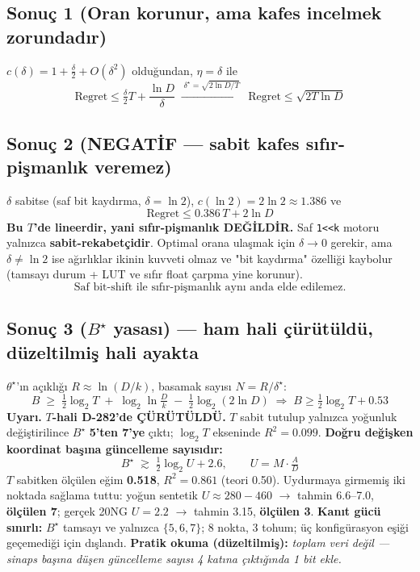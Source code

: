 \documentclass[11pt]{article}
\newenvironment{notkutu}{\def\FrameCommand{\fboxsep=6pt\colorbox{kutu}}\MakeFramed{\advance\hsize-\width\FrameRestore}\small}{\endMakeFramed}
\begin{document}
\subsection*{Sonuç 1 (Oran korunur, ama kafes incelmek zorundadır)}
$c(\delta) = 1 + \tfrac{\delta}{2} + O(\delta^2)$ olduğundan, $\eta=\delta$ ile
\[\mathrm{Regret} \le \tfrac{\delta}{2}T + \frac{\ln D}{\delta} \;\xrightarrow{\;\delta^\star=\sqrt{2\ln D/T}\;}\; \mathrm{Regret} \le \sqrt{2T\ln D}\]
\subsection*{Sonuç 2 (NEGATİF — sabit kafes sıfır-pişmanlık veremez)}
$\delta$ sabitse (saf bit kaydırma, $\delta=\ln2$), $c(\ln 2) = 2\ln 2 \approx 1.386$ ve
\[\mathrm{Regret} \le 0.386\,T + 2\ln D\]
\textbf{Bu $T$'de lineerdir, yani sıfır-pişmanlık DEĞİLDİR.} Saf \texttt{1<<k} motoru yalnızca \textbf{sabit-rekabetçidir}. Optimal orana ulaşmak için $\delta\to 0$ gerekir, ama $\delta\neq\ln2$ ise ağırlıklar ikinin kuvveti olmaz ve "bit kaydırma" özelliği kaybolur (tamsayı durum + LUT ve sıfır float çarpma yine korunur).
\[\boxed{\text{Saf bit-shift ile sıfır-pişmanlık aynı anda elde edilemez.}}\]
\subsection*{Sonuç 3 ($B^\star$ yasası) —  ham hali çürütüldü, düzeltilmiş hali ayakta}
$\theta^\star$'ın açıklığı $R\approx\ln(D/k)$, basamak sayısı $N=R/\delta^\star$:
\[B \;\ge\; \tfrac12\log_2 T \;+\; \log_2\ln\tfrac{D}{k} \;-\; \tfrac12\log_2(2\ln D)\;\Longrightarrow\; B \ge \tfrac12\log_2 T + 0.53\]
\begin{notkutu}\textbf{Uyarı.} \textbf{$T$-hali D-282'de ÇÜRÜTÜLDÜ.} $T$ sabit tutulup yalnızca yoğunluk değiştirilince $B^\star$ \textbf{5'ten 7'ye} çıktı; $\log_2T$ ekseninde $R^2{=}0.099$. \textbf{Doğru değişken koordinat başına güncelleme sayısıdır:}
\[B^\star \;\gtrsim\; \tfrac12\log_2 U + 2.6,\qquad U = M\cdot\tfrac{A}{D}\]
$T$ sabitken ölçülen eğim \textbf{0.518}, $R^2{=}0.861$ (teori 0.50). Uydurmaya girmemiş iki noktada sağlama tuttu: yoğun sentetik $U{\approx}280{-}460$ $\rightarrow$ tahmin 6.6–7.0, \textbf{ölçülen 7}; gerçek 20NG $U{=}2.2$ $\rightarrow$ tahmin 3.15, \textbf{ölçülen 3}. \textbf{Kanıt gücü sınırlı:} $B^\star$ tamsayı ve yalnızca $\{5,6,7\}$; 8 nokta, 3 tohum; üç konfigürasyon eşiği geçemediği için dışlandı.
\end{notkutu}
\begin{notkutu}\textbf{Pratik okuma (düzeltilmiş):} \emph{toplam veri değil — sinaps başına düşen güncelleme sayısı 4 katına çıktığında 1 bit ekle.}
\end{notkutu}
\end{document}
